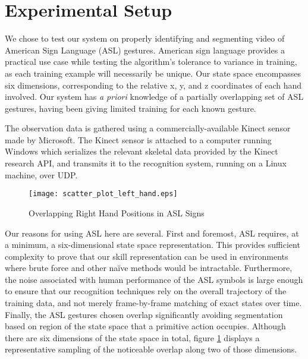 \documentclass[letterpaper]{article}
\begin{document}

\section{Experimental Setup}
\label{sec:experiment}
We chose to test our system on properly identifying and segmenting video of American Sign Language (ASL) gestures. American sign language provides a practical use case while testing the algorithm's tolerance to variance in training, as each training example will necessarily be unique. Our state space encompasses six dimensions, corresponding to the relative x, y, and z coordinates of each hand involved.  Our system has \textit{a priori} knowledge of a partially overlapping set of ASL gestures, having been giving limited training for each known gesture.

The observation data is gathered using a commercially-available Kinect sensor made by Microsoft.  The Kinect sensor is attached to a computer running Windows which serializes the relevant skeletal data provided by the Kinect research API, and transmits it to the recognition system, running on a Linux machine, over UDP.  

\begin{figure}
\begin{center}
\texttt{[image: scatter\_plot\_left\_hand.eps]}
\caption{Overlapping Right Hand Positions in ASL Signs}
\label{fig:asl_sign_overlap}
\end{center}
\end{figure}

Our reasons for using ASL here are several.  First and foremost, ASL requires, at a minimum, a six-dimensional state space representation.  This provides sufficient complexity to prove that our skill representation can be used in environments where brute force and other na\"ive methods would be intractable.  Furthermore, the noise associated with human performance of the ASL symbols is large enough to ensure that our recognition techniques rely on the overall trajectory of the training data, and not merely frame-by-frame matching of exact states over time.  Finally, the ASL gestures chosen overlap significantly avoiding segmentation based on region of the state space that a primitive action occupies. Although there are six dimensions of the state space in total, figure \ref{fig:asl_sign_overlap} displays a representative sampling of the noticeable overlap along two of those dimensions.
\end{document}
